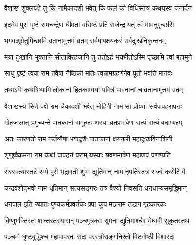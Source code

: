 \label{sec:padma-vaishakha-shukla-mohini}

\ganapatyadiDhyanam
\padmaPuranam



\twolineshloka
{वैशाख शुक्लपक्षे तु किं नामैकादशी भवेत्}
{किं फलं को विधिस्तत्र कथयस्व जनार्दन}%


\twolineshloka
{इदमेव पुरा पृष्टं रामचन्द्रेण धीमता}
{वसिष्ठं प्रति राजेन्द्र यत् त्वं मामनुपृच्छसि}%


\twolineshloka
{भगवञ्छ्रोतुमिच्छामि व्रतानामुत्तमं व्रतम्}
{सर्वपापक्षयकरं सर्वदुःखनिकृन्तनम्}%

\twolineshloka
{मया दुःखानि भुक्तानि सीताविरहजानि तु}
{ततोऽहं भयभीतोऽस्मि पृच्छामि त्वां महामुने}%


\twolineshloka
{साधु पृष्टं त्वया राम तवैषा नैष्ठिकी मतिः}
{त्वन्नामग्रहणेनैव पूतो भवति मानवः}%

\twolineshloka
{तथाऽपि कथयिष्यामि लोकानां हितकाम्यया}
{पवित्रं पावनानां च व्रतानामुत्तमं व्रतम्}%

\twolineshloka
{वैशाखस्य सिते पक्षे राम चैकादशी भवेत्}
{मोहिनी नाम सा प्रोक्ता सर्वपापहरापराः}%

\twolineshloka
{मोहजालात् प्रमुच्यन्ते पातकानां समूहतः}
{अस्या व्रतप्रभावेण सत्यं सत्यं वदाम्यहम्}%

\twolineshloka
{अतः कारणतो राम कर्तव्यैषा भवादृशैः}
{पातकानां क्षयकरी महादुःखविनाशिनी}%

\twolineshloka
{शृणुष्वैकमना राम कथां पापहरां पराम्}
{यस्याः श्रवणमात्रेण महापापं प्रणश्यति}%

\twolineshloka
{सरस्वत्यास्तटे रम्ये पुरी भद्रावती शुभा}
{द्युतिमान् नाम नृपतिस्तत्र राज्यं करोति वै}%

\twolineshloka
{चन्द्रवंशोद्भवो नाम धृतिमान् सत्यसङ्गरः}
{तत्र वैश्यो निवसति धनधान्यसमृद्धिमान्}%

\twolineshloka
{धनपाल इति ख्यातः पुण्यकर्मप्रवर्तकः}
{प्रपा कूप मठाराम तडाग गृहकारकः}%

\twolineshloka
{विष्णुभक्तिरतः शान्तस्तस्यासन् पञ्चपुत्रकाः}
{सुमना द्युतिमांश्चैव मेधावी सुकृतस्तथा}%

\twolineshloka
{पञ्चमो धृष्टबुद्धिश्च महापापरतः सदा}
{परस्त्रीसङ्गनिरतो विटगोष्ठी विशारदः}%

